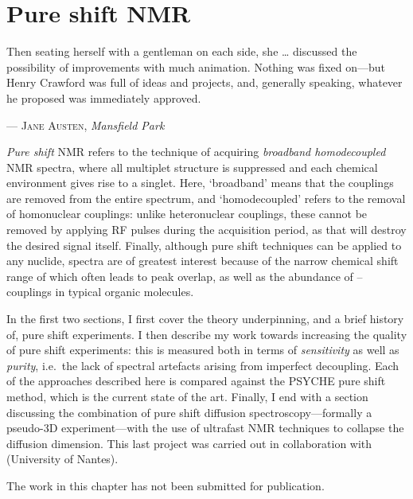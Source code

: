 \chapter{Pure shift NMR}
\label{chpt:pureshift}

\epigraph{\singlespacing%
Then seating herself with a gentleman on each side, she \ldots{} discussed the possibility of improvements with much animation. Nothing was fixed on---but Henry Crawford was full of ideas and projects, and, generally speaking, whatever he proposed was immediately approved.
}{--- \textsc{Jane Austen}, \textit{Mansfield Park}}

\textit{Pure shift} NMR refers to the technique of acquiring \textit{broadband homodecoupled} NMR spectra, where all multiplet structure is suppressed and each chemical environment gives rise to a singlet.\autocite{Zangger2015PNMRS,Castanar2017MRC}
Here, `broadband' means that the couplings are removed from the entire spectrum, and `homodecoupled' refers to the removal of homonuclear couplings: unlike heteronuclear couplings, these cannot be removed by applying RF pulses during the acquisition period, as that will destroy the desired signal itself.
Finally, although pure shift techniques can be applied to any nuclide, \proton{} spectra are of greatest interest because of the narrow chemical shift range of \proton{} which often leads to peak overlap, as well as the abundance of \proton{}--\proton{} couplings in typical organic molecules.

In the first two sections, I first cover the theory underpinning, and a brief history of, pure shift experiments.
I then describe my work towards increasing the quality of pure shift experiments: this is measured both in terms of \textit{sensitivity} as well as \textit{purity}, i.e.\ the lack of spectral artefacts arising from imperfect decoupling.
Each of the approaches described here is compared against the PSYCHE pure shift method, which is the current state of the art.
Finally, I end with a section discussing the combination of pure shift diffusion spectroscopy---formally a pseudo-3D experiment---with the use of ultrafast NMR techniques to collapse the diffusion dimension.
This last project was carried out in collaboration with \JND{} (University of Nantes).

The work in this chapter has not been submitted for publication.

\clearpage









\printbibliography[heading=subbibnumbered]{}
